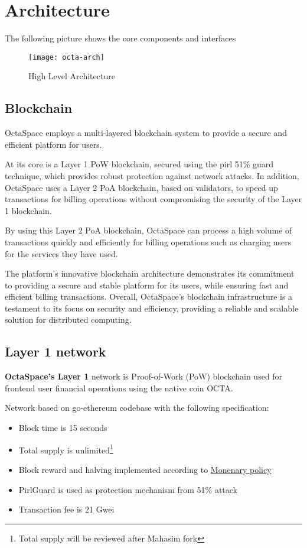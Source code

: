 \section{Architecture}

The following picture shows the core components and interfaces

\begin{figure}[h]
    \centering
    \texttt{[image: octa-arch]}
    \caption{High Level Architecture}
\end{figure}

\subsection{Blockchain}
OctaSpace employs a multi-layered blockchain system to provide a secure and efficient platform for users.

At its core is a Layer 1 PoW blockchain, secured using the pirl 51\% guard technique, which provides robust protection against network attacks.
In addition, OctaSpace uses a Layer 2 PoA blockchain, based on validators, to speed up transactions for billing operations without compromising the security of the Layer 1 blockchain.

By using this Layer 2 PoA blockchain, OctaSpace can process a high volume of transactions quickly and efficiently
for billing operations such as charging users for the services they have used.

The platform's innovative blockchain architecture demonstrates its commitment to providing a secure and stable platform for its users, while ensuring fast and efficient billing transactions.
Overall, OctaSpace's blockchain infrastructure is a testament to its focus on security and efficiency, providing a reliable and scalable solution for distributed computing.

\newpage

\subsection{Layer 1 network}

\textbf{OctaSpace's Layer 1} network is Proof-of-Work (PoW\cite{pow}) blockchain used for frontend user financial operations using the native coin OCTA.

Network based on go-ethereum\cite{go-ethereum} codebase with the following specification:

\begin{itemize}
    \item Block time is 15 seconds
    \item Total supply is unlimited\footnote{Total supply will be reviewed after Mahasim fork}
    \item Block reward and halving implemented according to \hyperref[sec:mp]{Monenary policy}
    \item PirlGuard is used as protection mechanism from 51\% attack
    \item Transaction fee is 21 Gwei
\end{itemize}

